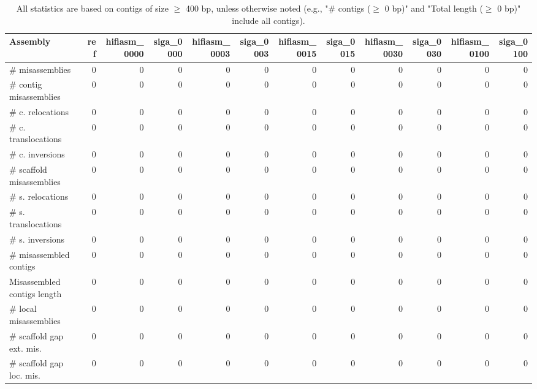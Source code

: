 \documentclass[12pt,a4paper]{article}
\begin{document}
\begin{table}[ht]
\begin{center}
\caption{All statistics are based on contigs of size $\geq$ 400 bp, unless otherwise noted (e.g., "\# contigs ($\geq$ 0 bp)" and "Total length ($\geq$ 0 bp)" include all contigs).}
\begin{tabular}{|l*{11}{|r}|}
\hline
Assembly & ref & hifiasm\_0000 & siga\_0000 & hifiasm\_0003 & siga\_0003 & hifiasm\_0015 & siga\_0015 & hifiasm\_0030 & siga\_0030 & hifiasm\_0100 & siga\_0100 \\ \hline
\# misassemblies & 0 & 0 & 0 & 0 & 0 & 0 & 0 & 0 & 0 & 0 & 0 \\ \hline
\hspace{2mm}\# contig misassemblies & 0 & 0 & 0 & 0 & 0 & 0 & 0 & 0 & 0 & 0 & 0 \\ \hline
\hspace{5mm}\# c. relocations & 0 & 0 & 0 & 0 & 0 & 0 & 0 & 0 & 0 & 0 & 0 \\ \hline
\hspace{5mm}\# c. translocations & 0 & 0 & 0 & 0 & 0 & 0 & 0 & 0 & 0 & 0 & 0 \\ \hline
\hspace{5mm}\# c. inversions & 0 & 0 & 0 & 0 & 0 & 0 & 0 & 0 & 0 & 0 & 0 \\ \hline
\hspace{2mm}\# scaffold misassemblies & 0 & 0 & 0 & 0 & 0 & 0 & 0 & 0 & 0 & 0 & 0 \\ \hline
\hspace{5mm}\# s. relocations & 0 & 0 & 0 & 0 & 0 & 0 & 0 & 0 & 0 & 0 & 0 \\ \hline
\hspace{5mm}\# s. translocations & 0 & 0 & 0 & 0 & 0 & 0 & 0 & 0 & 0 & 0 & 0 \\ \hline
\hspace{5mm}\# s. inversions & 0 & 0 & 0 & 0 & 0 & 0 & 0 & 0 & 0 & 0 & 0 \\ \hline
\# misassembled contigs & 0 & 0 & 0 & 0 & 0 & 0 & 0 & 0 & 0 & 0 & 0 \\ \hline
Misassembled contigs length & 0 & 0 & 0 & 0 & 0 & 0 & 0 & 0 & 0 & 0 & 0 \\ \hline
\# local misassemblies & 0 & 0 & 0 & 0 & 0 & 0 & 0 & 0 & 0 & 0 & 0 \\ \hline
\# scaffold gap ext. mis. & 0 & 0 & 0 & 0 & 0 & 0 & 0 & 0 & 0 & 0 & 0 \\ \hline
\# scaffold gap loc. mis. & 0 & 0 & 0 & 0 & 0 & 0 & 0 & 0 & 0 & 0 & 0 \\ \hline

\end{tabular}
\end{center}
\end{table}
\end{document}
